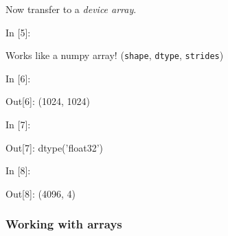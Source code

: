     Now transfer to a \emph{device array}.

    \begin{BGVerbatim}[commandchars=\\\{\}]
{\color{incolor}In [{\color{incolor}5}]:}    
\end{BGVerbatim}

    Works like a numpy array! (\texttt{shape}, \texttt{dtype},
\texttt{strides})

    \begin{BGVerbatim}[commandchars=\\\{\}]
{\color{incolor}In [{\color{incolor}6}]:} 
\end{BGVerbatim}

\begin{BGVerbatim}[commandchars=\\\{\}]
{\color{outcolor}Out[{\color{outcolor}6}]:} (1024, 1024)
\end{BGVerbatim}
            
    \begin{BGVerbatim}[commandchars=\\\{\}]
{\color{incolor}In [{\color{incolor}7}]:} 
\end{BGVerbatim}

\begin{BGVerbatim}[commandchars=\\\{\}]
{\color{outcolor}Out[{\color{outcolor}7}]:} dtype('float32')
\end{BGVerbatim}
            
    \begin{BGVerbatim}[commandchars=\\\{\}]
{\color{incolor}In [{\color{incolor}8}]:} 
\end{BGVerbatim}

\begin{BGVerbatim}[commandchars=\\\{\}]
{\color{outcolor}Out[{\color{outcolor}8}]:} (4096, 4)
\end{BGVerbatim}
            
    \hypertarget{working-with-arrays}{%
\subsubsection{Working with arrays}\label{working-with-arrays}}

